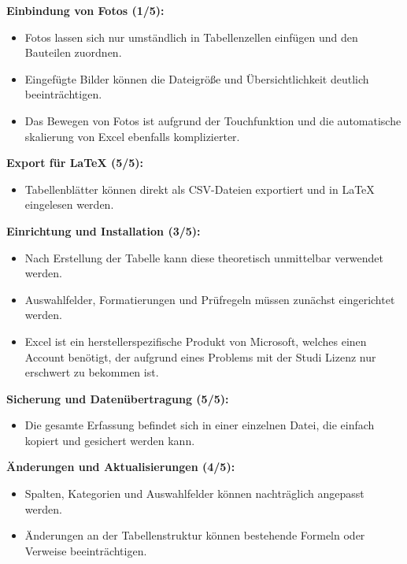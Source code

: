 \medskip
\textbf{Einbindung von Fotos (1/5):}
\begin{itemize}[leftmargin=2em, nosep]
    \item[\minuspunkt] Fotos lassen sich nur umständlich in Tabellenzellen
    einfügen und den Bauteilen zuordnen.
    \item[\minuspunkt] Eingefügte Bilder können die Dateigröße und
    Übersichtlichkeit deutlich beeinträchtigen.
    \item[\minuspunkt]
    Das Bewegen von Fotos ist aufgrund der Touchfunktion und die automatische skalierung von Excel ebenfalls komplizierter.
\end{itemize}


\medskip
\textbf{Export für \LaTeX{} (5/5):}
\begin{itemize}[leftmargin=2em, nosep]
    \item[\pluspunkt] Tabellenblätter können direkt als CSV-Dateien
    exportiert und in \LaTeX{} eingelesen werden.
\end{itemize}

\medskip
\textbf{Einrichtung und Installation (3/5):}
\begin{itemize}[leftmargin=2em, nosep]
    \item[\pluspunkt] Nach Erstellung der Tabelle kann diese theoretisch unmittelbar
    verwendet werden.
    \item[\minuspunkt] Auswahlfelder, Formatierungen und Prüfregeln müssen
    zunächst eingerichtet werden.
    \item[\minuspunkt] Excel ist ein herstellerspezifische Produkt von Microsoft, welches einen Account benötigt, der aufgrund eines Problems mit der Studi Lizenz nur erschwert zu bekommen ist.
\end{itemize}

\medskip
\textbf{Sicherung und Datenübertragung (5/5):}
\begin{itemize}[leftmargin=2em, nosep]
    \item[\pluspunkt] Die gesamte Erfassung befindet sich in einer einzelnen
    Datei, die einfach kopiert und gesichert werden kann.
\end{itemize}

\medskip
\textbf{Änderungen und Aktualisierungen (4/5):}
\begin{itemize}[leftmargin=2em, nosep]
    \item[\pluspunkt] Spalten, Kategorien und Auswahlfelder können
    nachträglich angepasst werden.
    \item[\minuspunkt] Änderungen an der Tabellenstruktur können bestehende
    Formeln oder Verweise beeinträchtigen.
\end{itemize}

